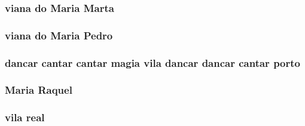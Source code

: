 \subsubsection[{\texorpdfstring{Marta}{Marta}}]{\setlength{\rightskip}{0pt plus 5cm}viana do {\bf Maria} Marta}\hypertarget{candidatos_8txt_a9439c806cb17f3371bbee523ca9b13ec}{}\label{candidatos_8txt_a9439c806cb17f3371bbee523ca9b13ec}
\subsubsection[{\texorpdfstring{Pedro}{Pedro}}]{\setlength{\rightskip}{0pt plus 5cm}viana do {\bf Maria} Pedro}\hypertarget{candidatos_8txt_af84719fafa1b55d65980e3a27b236714}{}\label{candidatos_8txt_af84719fafa1b55d65980e3a27b236714}
\subsubsection[{\texorpdfstring{porto}{porto}}]{ {\bf dancar} {\bf cantar} {\bf cantar} {\bf magia} vila {\bf dancar} {\bf dancar} {\bf cantar} porto}\hypertarget{candidatos_8txt_a50f37943ca5db274938bcee517a283cc}{}\label{candidatos_8txt_a50f37943ca5db274938bcee517a283cc}
\subsubsection[{\texorpdfstring{Raquel}{Raquel}}]{ {\bf Maria} Raquel}\hypertarget{candidatos_8txt_a0fa004e8ae93e7afad527aaa2bb04dff}{}\label{candidatos_8txt_a0fa004e8ae93e7afad527aaa2bb04dff}
\subsubsection[{\texorpdfstring{real}{real}}]{\setlength{\rightskip}{0pt plus 5cm}vila real}\hypertarget{candidatos_8txt_a38df1df7696364439f75acd6d9e12db3}{}\label{candidatos_8txt_a38df1df7696364439f75acd6d9e12db3}
